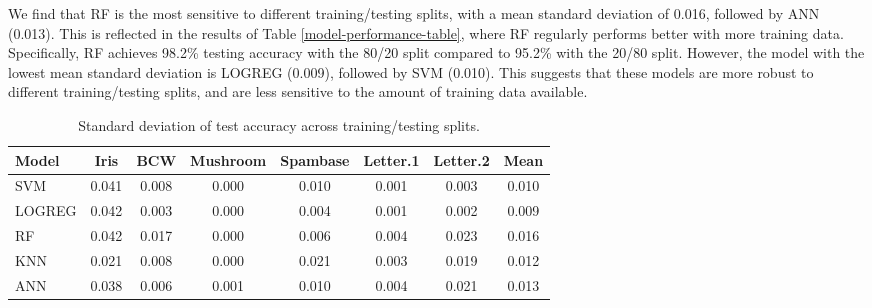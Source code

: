 \documentclass{article}
\begin{document}
We find that RF is the most sensitive to different training/testing splits,
with a mean standard deviation of 0.016, followed by ANN (0.013). This
is reflected in the results of Table \ref{model-performance-table}, where RF
regularly performs better with more training data. Specifically, RF achieves
98.2\% testing accuracy with the 80/20 split compared to 95.2\% with the 20/80
split. However, the model with the lowest mean standard deviation is LOGREG
(0.009), followed by SVM (0.010). This suggests that these models are more
robust to different training/testing splits, and are less sensitive to the
amount of training data available.

\begin{table}
	\caption{Standard deviation of test accuracy across training/testing splits.}
	\label{training-testing-sensitivity-table}
	\centering
	\begin{tabular}{l|c|c|c|c|c|c|c}
		\toprule

		\textbf{Model} & \multicolumn{1}{c|}{Iris} & \multicolumn{1}{c|}{BCW} & \multicolumn{1}{c|}{Mushroom} & \multicolumn{1}{c|}{Spambase} & \multicolumn{1}{c|}{Letter.1} & \multicolumn{1}{c|}{Letter.2} & \multicolumn{1}{c}{Mean} \\ \midrule
		SVM            & 0.041                     & 0.008                    & 0.000                         & 0.010                         & 0.001                         & 0.003                         & 0.010                    \\
		LOGREG         & 0.042                     & 0.003                    & 0.000                         & 0.004                         & 0.001                         & 0.002                         & 0.009                    \\
		RF             & 0.042                     & 0.017                    & 0.000                         & 0.006                         & 0.004                         & 0.023                         & 0.016                    \\
		KNN            & 0.021                     & 0.008                    & 0.000                         & 0.021                         & 0.003                         & 0.019                         & 0.012                    \\
		ANN            & 0.038                     & 0.006                    & 0.001                         & 0.010                         & 0.004                         & 0.021                         & 0.013                    \\

		\bottomrule
	\end{tabular}
\end{table}
\end{document}
